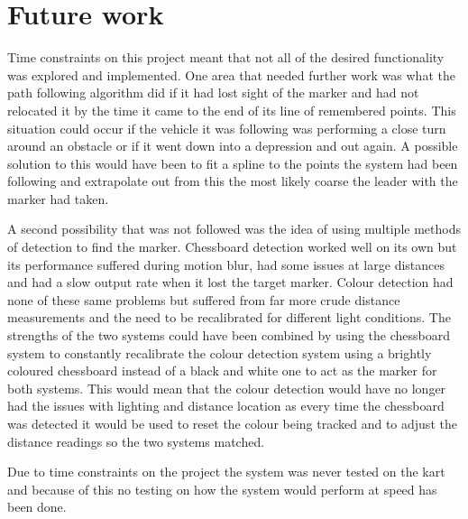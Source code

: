 \section{Future work}
Time constraints on this project meant that not all of the desired functionality was explored and implemented. One area that needed further work was what the path following algorithm did if it had lost sight of the marker and had not relocated it by the time it came to the end of its line of remembered points. This situation could occur if the vehicle it was following was performing a close turn around an obstacle or if it went down into a depression and out again. A possible solution to this would have been to fit a spline to the points the system had been following and extrapolate out from this the most likely coarse the leader with the marker had taken. 

A second possibility that was not followed was the idea of using multiple methods of detection to find the marker. Chessboard detection worked well on its own but its performance suffered during motion blur, had some issues at large distances and had a slow output rate when it lost the target marker. Colour detection had none of these same problems but suffered from far more crude distance measurements and the need to be recalibrated for different light conditions. The strengths of the two systems could have been combined by using the chessboard system to constantly recalibrate the colour detection system using a brightly coloured chessboard instead of a black and white one to act as the marker for both systems. This would mean that the colour detection would have no longer had the issues with lighting and distance location as every time the chessboard was detected it would be used to reset the colour being tracked and to adjust the distance readings so the two systems matched.

Due to time constraints on the project the system was never tested on the kart and because of this no testing on how the system would perform at speed has been done.